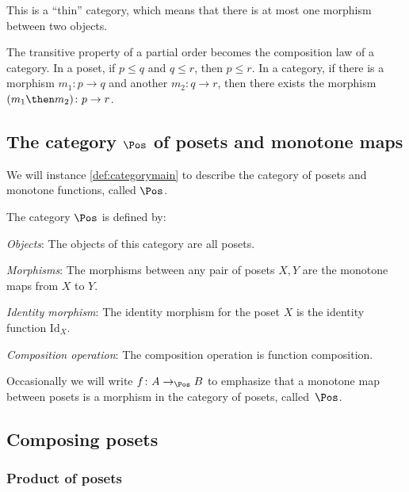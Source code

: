 This is a ``thin'' category, which means that there is at most one morphism
between two objects.

The transitive property of a partial order becomes the composition law
of a category. In a poset, if $p \leq q$ and $q \leq r$, then $p \leq r$.
In a category, if there is a morphism $m_1\colon p \to q$ and
another $m_2\colon q \to r$, then there exists the morphism
$(m_1 \then m_2)\colon p \to r$.



\subsection{The category $\Pos$ of posets and monotone maps}



We will instance \cref{def:categorymain} to describe the category of posets and monotone
functions, called $\Pos$.

\begin{definition}
    The category $\Pos$ is defined by:
    \begin{compactenum}
    \item \emph{Objects}: The objects of this category are all posets.
    \item \emph{Morphisms}: The morphisms between any pair of posets $X, Y$
    are the monotone maps from $X$ to $Y$.
    \item \emph{Identity morphism}:  The identity morphism for the poset $X$
    is the identity function $\text{Id}_X$.
    \item \emph{Composition operation}: The composition operation is function
    composition.
    \end{compactenum}
\end{definition}

Occasionally we will write $f \colon A \to_{\Pos} B$ to emphasize that a monotone map between posets is a morphism in the category of posets, called~$\Pos$.



\subsection{Composing posets}

\subsubsection{Product of posets}


